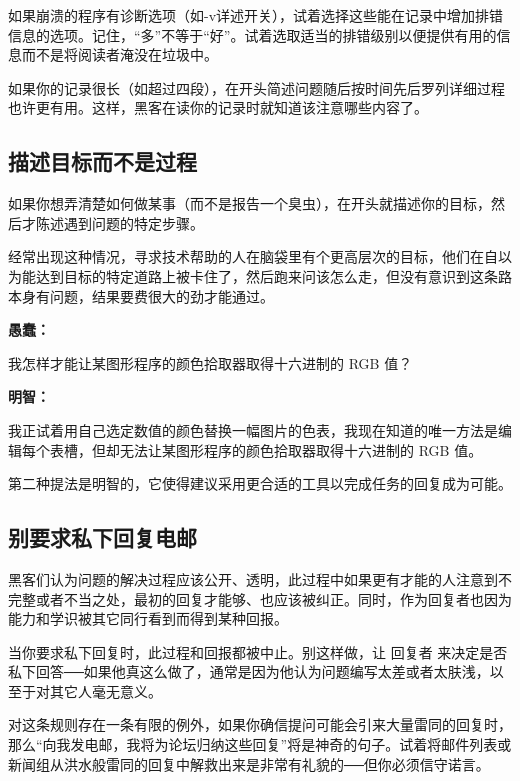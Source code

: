 如果崩溃的程序有诊断选项（如-v详述开关），试着选择这些能在记录中增加排错信息的选项。记住，“多”不等于“好”。试着选取适当的排错级别以便提供有用的信息而不是将阅读者淹没在垃圾中。

如果你的记录很长（如超过四段），在开头简述问题随后按时间先后罗列详细过程也许更有用。这样，黑客在读你的记录时就知道该注意哪些内容了。





\subsection{描述目标而不是过程}

如果你想弄清楚如何做某事（而不是报告一个臭虫），在开头就描述你的目标，然后才陈述遇到问题的特定步骤。

经常出现这种情况，寻求技术帮助的人在脑袋里有个更高层次的目标，他们在自以为能达到目标的特定道路上被卡住了，然后跑来问该怎么走，但没有意识到这条路本身有问题，结果要费很大的劲才能通过。

\textbf{愚蠢：}

我怎样才能让某图形程序的颜色拾取器取得十六进制的 RGB 值？

\textbf{明智：}

我正试着用自己选定数值的颜色替换一幅图片的色表，我现在知道的唯一方法是编辑每个表槽，但却无法让某图形程序的颜色拾取器取得十六进制的 RGB 值。

第二种提法是明智的，它使得建议采用更合适的工具以完成任务的回复成为可能。





\subsection{别要求私下回复电邮}

黑客们认为问题的解决过程应该公开、透明，此过程中如果更有才能的人注意到不完整或者不当之处，最初的回复才能够、也应该被纠正。同时，作为回复者也因为能力和学识被其它同行看到而得到某种回报。

当你要求私下回复时，此过程和回报都被中止。别这样做，让 回复者 来决定是否私下回答──如果他真这么做了，通常是因为他认为问题编写太差或者太肤浅，以至于对其它人毫无意义。

对这条规则存在一条有限的例外，如果你确信提问可能会引来大量雷同的回复时，那么“向我发电邮，我将为论坛归纳这些回复”将是神奇的句子。试着将邮件列表或新闻组从洪水般雷同的回复中解救出来是非常有礼貌的──但你必须信守诺言。





